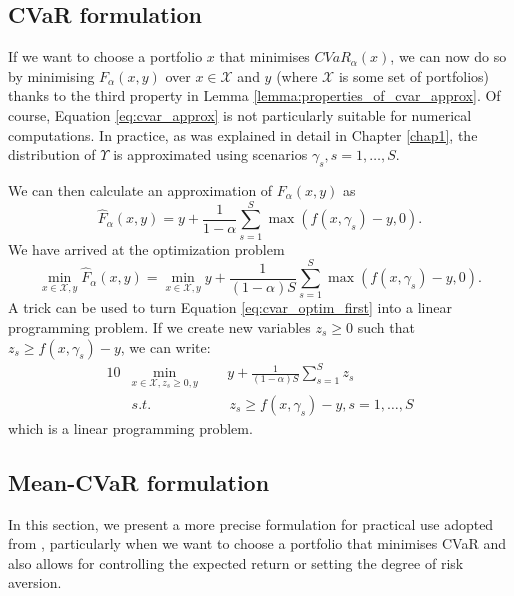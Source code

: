 \subsection{CVaR formulation}
If we want to choose a portfolio $x$ that minimises $CVaR_{\alpha}(x)$, we can now do so by minimising $F_{\alpha}(x,y)$ over $x \in \mathcal{X}$ and $y$ (where $\mathcal{X}$ is some set of portfolios) thanks to the third property in Lemma \ref{lemma:properties_of_cvar_approx}. Of course, Equation \ref{eq:cvar_approx} is not particularly suitable for numerical computations. In practice, as was explained in detail in Chapter \ref{chap1}, the distribution of $\Upsilon$ is approximated using scenarios $\gamma_s, s=1,\dots,S$.

We can then calculate an approximation of $F_{\alpha}(x,y)$ as
\begin{equation}
\label{eq:cvar_approx_approx}
\hat{F}_{\alpha}(x,y)=y + \frac{1}{1-\alpha} \sum_{s=1}^S  \max (f(x,\gamma_s)-y,0).
\end{equation}
We have arrived at the optimization problem
\begin{equation}
\label{eq:cvar_optim_first}
\underset{x \in \mathcal{X}, y}{\min} \hat{F}_{\alpha}(x,y)= \underset{x \in \mathcal{X}, y}{\min} y + \frac{1}{(1-\alpha)S} \sum_{s=1}^S  \max (f(x,\gamma_s)-y,0).
\end{equation}
A trick can be used to turn Equation \ref{eq:cvar_optim_first} into a linear programming problem. If we create new variables $z_s \geq 0$ such that $z_s \geq f(x,\gamma_s)-y$, we can write:
\begin{alignat}{10}
& \underset{x \in \mathcal{X}, z_s \geq 0, y}{\min}  \, \, \, && y + \frac{1}{(1-\alpha)S} \sum_{s=1}^S z_s \\
&s.t. && \, z_s \geq f(x,\gamma_s)-y, s=1,\dots,S
\end{alignat}
which is a linear programming problem.
\subsection{Mean-CVaR formulation}
In this section, we present a more precise formulation for practical use adopted from \cite{cvar_robust_mean_cvar_portfolio_optimization}, particularly when we want to choose a portfolio that minimises CVaR and also allows for controlling the expected return or setting the degree of risk aversion.
